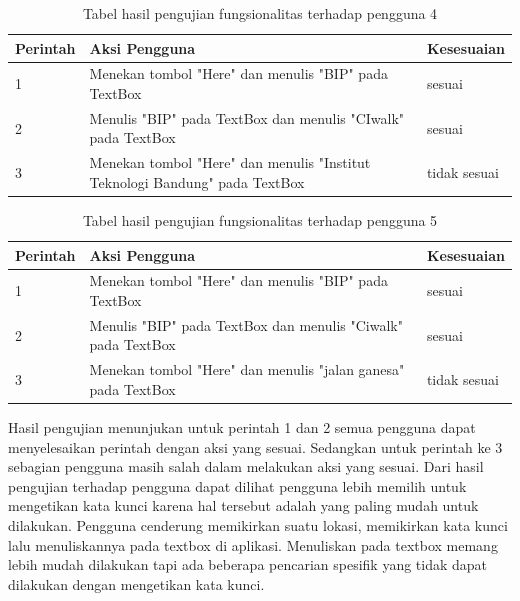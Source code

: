 \begin{table}[h!]
	\centering
		\begin{tabular}{|p{}|p{9cm}|p{2cm}|}\hline
				Perintah & Aksi Pengguna & Kesesuaian \\ \hline
				1 & Menekan tombol "Here" dan menulis "BIP" pada TextBox & sesuai \\ \hline
				2 & Menulis "BIP" pada TextBox dan menulis "CIwalk" pada TextBox & sesuai \\ \hline
				3 & Menekan tombol "Here" dan menulis "Institut Teknologi Bandung" pada TextBox & tidak sesuai \\ \hline
		\end{tabular}
	\caption{Tabel hasil pengujian fungsionalitas terhadap pengguna 4}
	\label{tab:TabelHasilPengujianFungsionalitasTerhadapPengguna}
\end{table}

\begin{table}[h!]
	\centering
		\begin{tabular}{|p{}|p{9cm}|p{2cm}|}\hline
				Perintah & Aksi Pengguna & Kesesuaian \\ \hline
				1 & Menekan tombol "Here" dan menulis "BIP" pada TextBox & sesuai \\ \hline
				2 & Menulis "BIP" pada TextBox dan menulis "Ciwalk" pada TextBox & sesuai \\ \hline
				3 & Menekan tombol "Here" dan menulis "jalan ganesa" pada TextBox & tidak sesuai \\ \hline
		\end{tabular}
	\caption{Tabel hasil pengujian fungsionalitas terhadap pengguna 5}
	\label{tab:TabelHasilPengujianFungsionalitasTerhadapPengguna}
\end{table}

\hspace{0.5cm} Hasil pengujian menunjukan untuk perintah 1 dan 2 semua pengguna dapat menyelesaikan perintah dengan aksi yang sesuai. Sedangkan untuk perintah ke 3 sebagian pengguna masih salah dalam melakukan aksi yang sesuai. Dari hasil pengujian terhadap pengguna dapat dilihat pengguna lebih memilih untuk mengetikan kata kunci karena hal tersebut adalah yang paling mudah untuk dilakukan. Pengguna cenderung memikirkan suatu lokasi, memikirkan kata kunci lalu menuliskannya pada textbox di aplikasi. Menuliskan pada textbox memang lebih mudah dilakukan tapi ada beberapa pencarian spesifik yang tidak dapat dilakukan dengan mengetikan kata kunci.   

